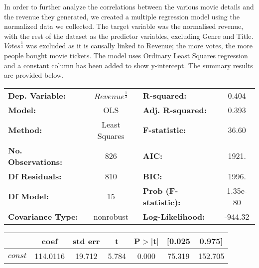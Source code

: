     In order to further analyze the correlations between the various movie details
    and the revenue they generated, we created a multiple regression model using the
    normalized data we collected. 
    The target variable was the normalised revenue, with the rest of the dataset as the 
        predictor variables, excluding Genre and Title.
    $Votes^\frac{1}{3}$ was excluded as it is causally linked to Revenue; the more votes, the more people bought movie tickets. 
    The model uses Ordinary Least Squares regression and a constant column has been added to show y-intercept.
    The summary results are provided below.
    \begin{table}[H]
        \begin{center}
            \begin{tabular}{lclc}
                \toprule
                \textbf{Dep. Variable:}           &  $Revenue^{\frac{1}{3}}$   & \textbf{  R-squared:         } &     0.404   \\
                \textbf{Model:}                   &       OLS        & \textbf{  Adj. R-squared:    } &     0.393   \\
                \textbf{Method:}                  &  Least Squares   & \textbf{  F-statistic:       } &     36.60   \\
                \textbf{No. Observations:}        &         826      & \textbf{  AIC:               } &     1921.   \\
                \textbf{Df Residuals:}            &         810      & \textbf{  BIC:               } &     1996.   \\
                \textbf{Df Model:}                &          15      & \textbf{  Prob (F-statistic):} &  1.35e-80   \\
                \textbf{Covariance Type:}         &    nonrobust     & \textbf{  Log-Likelihood:    } &   -944.32   \\
                \bottomrule
            \end{tabular}
            \begin{tabular}{lcccccc}
                                                & \textbf{coef} & \textbf{std err} & \textbf{t} & \textbf{P$> |$t$|$} & \textbf{[0.025} & \textbf{0.975]}  \\
                \midrule
                \textbf{$const$}                &     114.0116  &       19.712     &     5.784  &         0.000        &       75.319    &      152.705     \\

\end{tabular}
\end{center}
\end{table}
